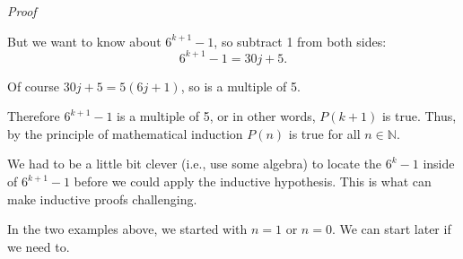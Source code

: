 \documentclass[11pt,]{book}
\makeatletter
\theoremstyle{ptxplainnotitle}
\theoremstyle{ptxplaintitle}
\renewcommand*{\proofname}{Proof}
\renewenvironment{proof}[1][\proofname]{\par
  \pushQED{\qed}%
  \normalfont \topsep6\p@\@plus6\p@\relax
  \trivlist
  \item\relax
    {\itshape
    #1\@addpunct{.}}\hspace\labelsep\ignorespaces
}{%
  \popQED\endtrivlist\@endpefalse
}
\theoremstyle{ptxdefinitionnotitle}
\theoremstyle{ptxdefinitiontitle}
\theoremstyle{ptxdefinitionnotitle}
\theoremstyle{ptxdefinitiontitle}
\theoremstyle{ptxdefinitionnotitle}
\theoremstyle{ptxdefinitiontitle}
\theoremstyle{ptxdefinitiontitlenonumber}
\theoremstyle{ptxdefinitiontitlenonumber}
\numberwithin{equation}{chapter}
\newcommand{\N}{\mathbb N}
\makeatother
\begin{document}
\begin{example}
\begin{proof}
%
\par
\hypertarget{p-562}{}%
But we want to know about \(6^{k+1} - 1\), so subtract 1 from both sides:%
\begin{equation*}
6^{k+1} - 1 = 30j + 5.
\end{equation*}
%
\par
\hypertarget{p-563}{}%
Of course \(30j+5 = 5(6j+1)\), so is a multiple of 5.%
\par
\hypertarget{p-564}{}%
Therefore \(6^{k+1} - 1\) is a multiple of 5, or in other words, \(P(k+1)\) is true. Thus, by the principle of mathematical induction \(P(n)\) is true for all \(n \in \N\).%
\end{proof}
\end{example}
\hypertarget{p-565}{}%
We had to be a little bit clever (i.e., use some algebra) to locate the \(6^k - 1\) inside of \(6^{k+1} - 1\) before we could apply the inductive hypothesis. This is what can make inductive proofs challenging.%
\par
\hypertarget{p-566}{}%
In the two examples above, we started with \(n = 1\) or \(n = 0\). We can start later if we need to.%
\end{document}
